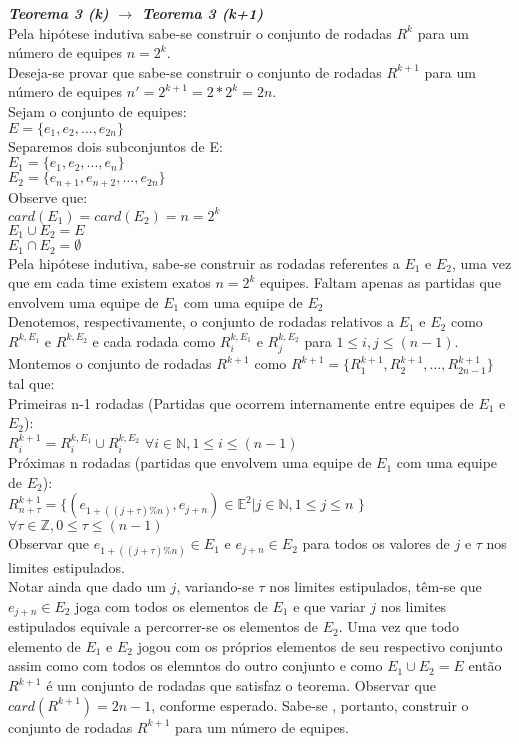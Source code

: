 \documentclass[twoside]{article}
\begin{document}
\begin{multicols}{2}
\textit{\textbf{Teorema 3 (k) $\rightarrow$ Teorema 3 (k+1)}}\\
Pela hipótese indutiva sabe-se construir o conjunto de rodadas $R^k$ para um número de equipes $n=2^k$.\\
Deseja-se provar que sabe-se construir o conjunto de rodadas $R^{k+1}$ para um número de equipes $n'=2^{k+1}=2*2^k=2n$.\\
Sejam o conjunto de equipes:\\
$E = \{e_1,e_2,\dots,e_{2n}\}$\\
Separemos dois subconjuntos de E:\\
$E_1 = \{e_1,e_2,...,e_{n}\}$\\
$E_2 = \{e_{n+1},e_{n+2},\dots,e_{2n}\}$\\
Observe que:\\
$card(E_1) = card(E_2) = n= 2^k$\\
$E_1 \cup E_2 = E$\\
$E_1 \cap E_2 = \emptyset$\\
Pela hipótese indutiva, sabe-se construir as rodadas referentes a $E_1$ e $E_2$, uma vez que em cada time existem exatos $n=2^k$ equipes. Faltam apenas as partidas que envolvem uma equipe de $E_1$ com uma equipe de $E_2$ \\
Denotemos, respectivamente, o conjunto de rodadas relativos a $E_1$ e $E_2$ como $R^{k,{E_1}}$ e $R^{k,{E_2}}$ e cada rodada como $R_i^{k,{E_1}}$ e $R_j^{k,{E_2}}$ para $1 \leq i,j \leq (n-1)$.\\
Montemos o conjunto de rodadas $R^{k+1}$ como $R^{k+1}=\{R_1^{k+1},R_2^{k+1},\dots,R_{2n-1}^{k+1}\}$ tal que:\\

Primeiras n-1 rodadas (Partidas que ocorrem internamente entre equipes de $E_1$ e $E_2$):\\
 $R_i^{k+1} = R_i^{k,{E_1}} \cup R_i^{k,{E_2}}$ $ \forall i \in \mathbb{N},1 \leq i \leq (n-1)$\\

Próximas n rodadas (partidas que envolvem uma equipe de $E_1$ com uma equipe de $E_2$):\\
$R_{n+\tau}^{k+1} = \{ ( e_{1+((j+\tau)\%n)},e_{j+n}) \in \mathbb{E}^2 |  j \in \mathbb{N},1 \leq j \leq n$ $\}$ $ \forall \tau \in \mathbb{Z},0 \leq \tau \leq (n-1)$\\

Observar que $e_{1+((j+\tau)\%n)} \in E_1$ e $e_{j+n} \in E_2$ para todos os valores de $j$ e $\tau$ nos limites estipulados.\\
Notar ainda que dado um $j$, variando-se $\tau$ nos limites estipulados, têm-se que $e_{j+n} \in E_2$ joga com todos os elementos de $E_1$ e que variar $j$ nos limites estipulados equivale a percorrer-se os elementos de $E_2$.
Uma vez que todo elemento de $E_1$ e $E_2$ jogou com os próprios elementos de seu respectivo conjunto assim como com todos os elemntos do outro conjunto e como $E_1 \cup E_2 = E$ então $R^{k+1}$ é um conjunto de rodadas que satisfaz o teorema. Observar que $card(R^{k+1}) = 2n-1$, conforme esperado. Sabe-se , portanto, construir o conjunto de rodadas $R^{k+1}$ para um número de equipes.\\


\end{multicols}
\end{document}
